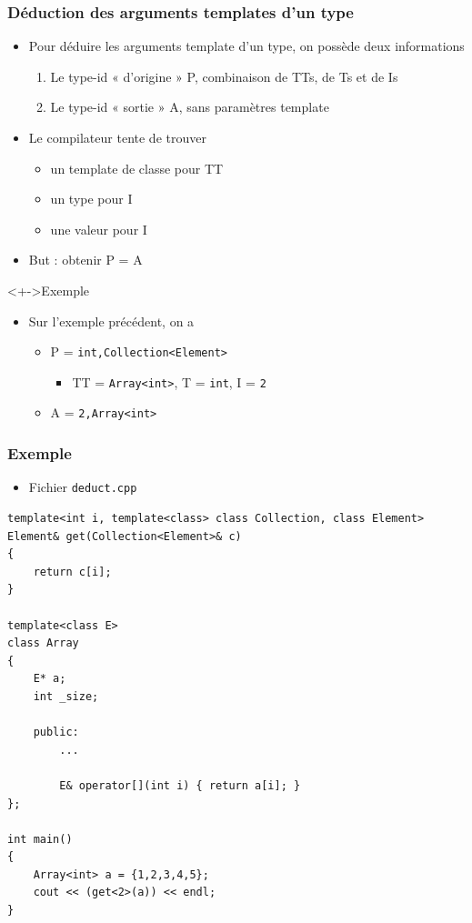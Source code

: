 \begin{frame}
\frametitle{Déduction des arguments templates d'un type}
\begin{itemize}[<+->]
\item Pour déduire les arguments template d'un type, on possède deux informations
	\begin{enumerate}
	\item Le type-id « d'origine » P, combinaison de TTs, de Ts et de Is
	\item Le type-id « sortie » A, sans paramètres template
	\end{enumerate}
\item Le compilateur tente de trouver 
	\begin{itemize}
	\item un template de classe pour TT
	\item un type pour I
	\item une valeur pour I
	\end{itemize}
\item But : obtenir P = A
\end{itemize}
\begin{exampleblock}<+->{Exemple}
	\begin{itemize}
	\item Sur l'exemple précédent, on a
		\begin{itemize}[<+->]
		\item P = \lstinline|int,Collection<Element>|
			\begin{itemize}
			\item TT = \lstinline|Array<int>|, T = \lstinline|int|, I = \lstinline|2|
			\end{itemize}
		\item A = \lstinline|2,Array<int>|
		\end{itemize}		
	\end{itemize}
\end{exampleblock}
\end{frame}

\begin{frame}[containsverbatim]
\frametitle{Exemple}
\begin{itemize}
\item Fichier \texttt{deduct.cpp}
\end{itemize}
\begin{lstlisting}
template<int i, template<class> class Collection, class Element>
Element& get(Collection<Element>& c)
{
	return c[i];
}

template<class E>
class Array
{
	E* a;
	int _size;

	public:
		...
		
		E& operator[](int i) { return a[i]; }
};

int main()
{
	Array<int> a = {1,2,3,4,5};
	cout << (get<2>(a)) << endl;
}
\end{lstlisting}
\end{frame}

